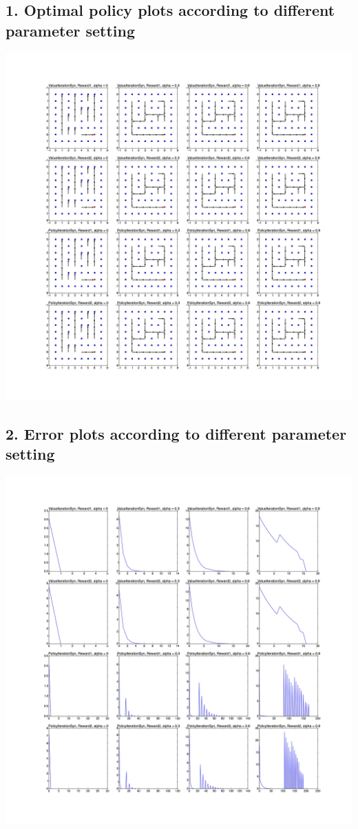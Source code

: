 \documentclass[12pt,a4paper,titlepage]{article}
\begin{document}
\subsection*{1. Optimal policy plots according to different parameter setting}
\includegraphics[scale=0.12]{PolicyPlot.jpg}
\newpage
\subsection*{2. Error plots according to different parameter setting}
\includegraphics[scale=0.12]{ErrorPlot.jpg}
\newpage
\end{document}
